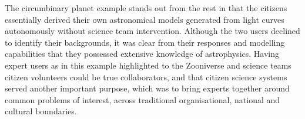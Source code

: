 \documentclass{sigchi}
\begin{document}
The circumbinary planet example stands out from the rest in that the citizens essentially derived their own astronomical models generated from light curves autonomously without science team intervention.  Although the two users declined to identify their backgrounds, it was clear from their responses and modelling capabilities that they possessed extensive knowledge of astrophysics. Having expert users as in this example highlighted to the Zooniverse and science teams citizen volunteers could be true collaborators, and that citizen science systems served another important purpose, which was to bring experts together around common problems of interest, across traditional organisational, national and cultural boundaries.


\end{document}
